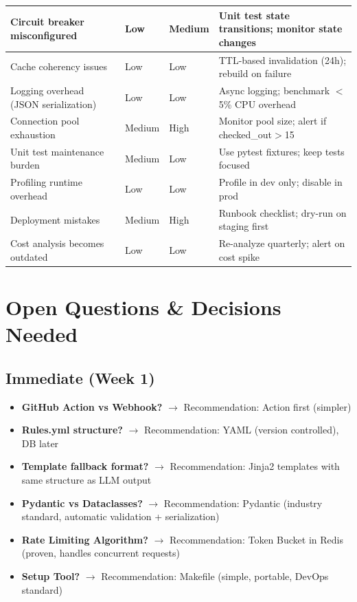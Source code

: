 \documentclass[11pt,a4paper]{article}
\begin{document}
\begin{longtable}{p{3.5cm}p{2cm}p{2cm}p{6cm}}
\midrule
Circuit breaker misconfigured & Low & Medium & Unit test state transitions; monitor state changes \\
\midrule
Cache coherency issues & Low & Low & TTL-based invalidation (24h); rebuild on failure \\
\midrule
Logging overhead (JSON serialization) & Low & Low & Async logging; benchmark $<$5\% CPU overhead \\
\midrule
Connection pool exhaustion & Medium & High & Monitor pool size; alert if checked\_out$>$15 \\
\midrule
Unit test maintenance burden & Medium & Low & Use pytest fixtures; keep tests focused \\
\midrule
Profiling runtime overhead & Low & Low & Profile in dev only; disable in prod \\
\midrule
Deployment mistakes & Medium & High & Runbook checklist; dry-run on staging first \\
\midrule
Cost analysis becomes outdated & Low & Low & Re-analyze quarterly; alert on cost spike \\
\bottomrule
\end{longtable}

\section{Open Questions \& Decisions Needed}

\subsection{Immediate (Week 1)}
\begin{itemize}[leftmargin=*]
    \item \textbf{GitHub Action vs Webhook?} $\rightarrow$ Recommendation: Action first (simpler)
    \item \textbf{Rules.yml structure?} $\rightarrow$ Recommendation: YAML (version controlled), DB later
    \item \textbf{Template fallback format?} $\rightarrow$ Recommendation: Jinja2 templates with same structure as LLM output
    \item \textbf{Pydantic vs Dataclasses?} $\rightarrow$ Recommendation: Pydantic (industry standard, automatic validation + serialization)
    \item \textbf{Rate Limiting Algorithm?} $\rightarrow$ Recommendation: Token Bucket in Redis (proven, handles concurrent requests)
    \item \textbf{Setup Tool?} $\rightarrow$ Recommendation: Makefile (simple, portable, DevOps standard)
\end{itemize}
\end{document}
